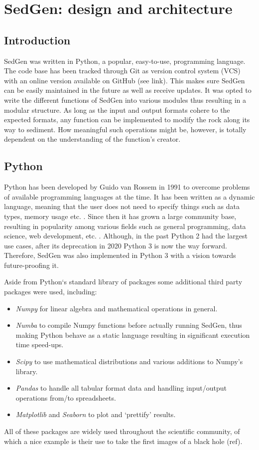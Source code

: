 \chapter{SedGen: design and architecture}\label{ch:sedgen_architecture}

%
%
\section{Introduction}
SedGen was written in Python, a popular, easy-to-use, programming language. %
The code base has been tracked through Git as version control system (VCS) with an online version available on GitHub (see link). %
This makes sure SedGen can be easily maintained in the future as well as receive updates. %
It was opted to write the different functions of SedGen into various modules thus resulting in a modular structure. %
As long as the input and output formats cohere to the expected formats, any function can be implemented to modify the rock along its way to sediment. %
How meaningful such operations might be, however, is totally dependent on the understanding of the function's creator. %


\section{Python}
Python has been developed by Guido van Rossem in 1991 to overcome problems of available programming languages at the time. %
It has been written as a dynamic language, meaning that the user does not need to specify things such as data types, memory usage etc. . %
Since then it has grown a large community base, resulting in popularity among various fields such as general programming, data science, web development, etc. . %
Although, in the past Python 2 had the largest use cases, after its deprecation in 2020 Python 3 is now the way forward. %
Therefore, SedGen was also implemented in Python 3 with a vision towards future-proofing it. %

Aside from Python`s standard library of packages some additional third party packages were used, including:
\begin{itemize}
    \item \textit{Numpy} for linear algebra and mathematical operations in general. %
    \item \textit{Numba} to compile Numpy functions before actually running SedGen, thus making Python behave as a static language resulting in significant execution time speed-ups. %
    \item \textit{Scipy} to use mathematical distributions and various additions to Numpy's library. %
    \item \textit{Pandas} to handle all tabular format data and handling input/output operations from/to spreadsheets. %
    \item \textit{Matplotlib} and \textit{Seaborn} to plot and `prettify' results.
\end{itemize}
All of these packages are widely used throughout the scientific community, of which a nice example is their use to take the first images of a black hole (ref). %


